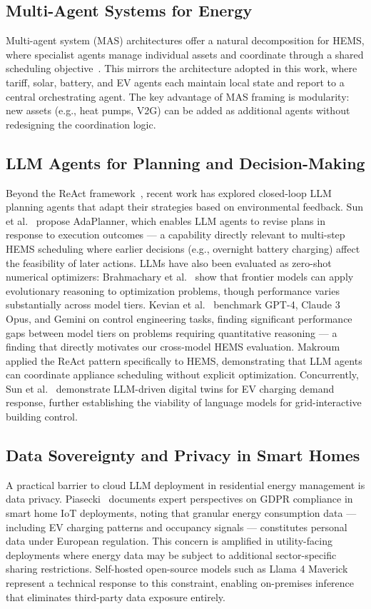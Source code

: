 \documentclass[conference]{IEEEtran}
\begin{document}
\subsection{Multi-Agent Systems for Energy}
Multi-agent system (MAS) architectures offer a natural decomposition
for HEMS, where specialist agents manage individual assets and coordinate
through a shared scheduling objective~\cite{binyamin2022mas}.
This mirrors the architecture adopted in this work, where tariff,
solar, battery, and EV agents each maintain local state and report
to a central orchestrating agent.
The key advantage of MAS framing is modularity: new assets (e.g., heat
pumps, V2G) can be added as additional agents without redesigning
the coordination logic.

\subsection{LLM Agents for Planning and Decision-Making}
Beyond the ReAct framework~\cite{yao2023react}, recent work has explored
closed-loop LLM planning agents that adapt their strategies based on
environmental feedback.
Sun et al.~\cite{sun2023adaplanner} propose AdaPlanner, which enables
LLM agents to revise plans in response to execution outcomes ---
a capability directly relevant to multi-step HEMS scheduling where
earlier decisions (e.g., overnight battery charging) affect the
feasibility of later actions.
LLMs have also been evaluated as zero-shot numerical optimizers:
Brahmachary et al.~\cite{brahmachary2024llmopt} show that frontier
models can apply evolutionary reasoning to optimization problems,
though performance varies substantially across model tiers.
Kevian et al.~\cite{kevian2024llmcontrol} benchmark GPT-4, Claude 3 Opus,
and Gemini on control engineering tasks, finding significant performance
gaps between model tiers on problems requiring quantitative reasoning ---
a finding that directly motivates our cross-model HEMS evaluation.
Makroum~\cite{makroum2025agentic} applied the ReAct pattern specifically
to HEMS, demonstrating that LLM agents can coordinate appliance scheduling
without explicit optimization.
Concurrently, Sun et al.~\cite{sun2025llmev} demonstrate LLM-driven
digital twins for EV charging demand response, further establishing
the viability of language models for grid-interactive building control.

\subsection{Data Sovereignty and Privacy in Smart Homes}
A practical barrier to cloud LLM deployment in residential energy
management is data privacy.
Piasecki~\cite{piasecki2024gdpr} documents expert perspectives on GDPR
compliance in smart home IoT deployments, noting that granular energy
consumption data --- including EV charging patterns and occupancy signals ---
constitutes personal data under European regulation.
This concern is amplified in utility-facing deployments where energy
data may be subject to additional sector-specific sharing restrictions.
Self-hosted open-source models such as Llama 4 Maverick represent a
technical response to this constraint, enabling on-premises inference
that eliminates third-party data exposure entirely.
\end{document}
